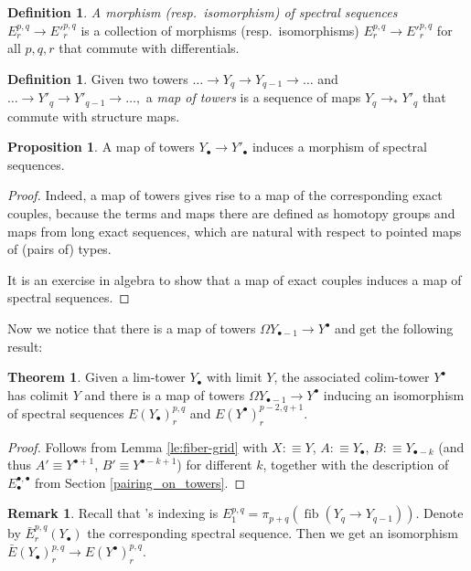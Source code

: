 \documentclass{amsart}
\theoremstyle{definition}
\newtheorem{thm}[theorem]{Theorem}
\newtheorem{prp}[theorem]{Proposition}
\newtheorem{de}[theorem]{Definition}
\newtheorem{re}[theorem]{Remark}
\newcommand{\fib}{\operatorname{fib}}
\newcommand{\pto}{\to_*}
\begin{document}
\begin{de}
    \textit{A morphism (resp.\ isomorphism) of spectral sequences} $E^{p,q}_r \to E'^{p,q}_r$ is a collection of morphisms (resp.\ isomorphisms) $E^{p,q}_r \to E'^{p,q}_r$ for all $p,q,r$ that commute with differentials.
\end{de}

\begin{de}
    Given two towers $\ldots \to Y_q \to Y_{q-1} \to \ldots$ and $\ldots \to Y'_q \to Y'_{q-1} \to \ldots,$ a \textit{map of towers} is a sequence of maps $Y_q \pto Y'_q$ that commute with structure maps.
\end{de}

\begin{prp}
    A map of towers $Y_\bullet \to Y'_\bullet$ induces a morphism of spectral sequences.
\end{prp}

\begin{proof}
    Indeed, a map of towers gives rise to a map of the corresponding exact couples, because the terms and maps there are defined as homotopy groups and maps from long exact sequences, which are natural with respect to pointed maps of (pairs of) types.

    It is an exercise in algebra to show that a map of exact couples induces a map of spectral sequences.
\end{proof}

Now we notice that there is a map of towers $\Omega Y_{\bullet-1} \to Y^\bullet$ and get the following result:
\begin{thm}
    Given a lim-tower $Y_\bullet$ with limit $Y$, the associated colim-tower $Y^\bullet$ has colimit $Y$ and there is a map of towers $\Omega Y_{\bullet-1} \to Y^\bullet$ inducing an isomorphism of spectral sequences $E(Y_\bullet)^{p,q}_r$ and $E(Y^\bullet)^{p-2,q+1}_r$.
\end{thm}
\begin{proof}
    Follows from Lemma \ref{le:fiber-grid} with $X : \equiv Y$, $A :\equiv Y_{\bullet}$, $B :\equiv Y_{\bullet - k}$ (and thus $A' \equiv Y^{\bullet+1}$, $B' \equiv Y^{\bullet-k+1}$) for different $k$, together with the description of $E^{\bullet,\bullet}_\bullet$ from Section \ref{pairing_on_towers}.
\end{proof}
\begin{re}
    Recall that \cite{Flo}'s indexing is $E^{p,q}_1 = \pi_{p+q}(\fib(Y_q \to Y_{q-1}))$. Denote by $\bar{E}^{p,q}_r(Y_\bullet)$ the corresponding spectral sequence. Then we get an isomorphism $\bar{E}(Y_\bullet)^{p,q}_r \to E(Y^\bullet)^{p,q}_r$.
\end{re}
\end{document}
